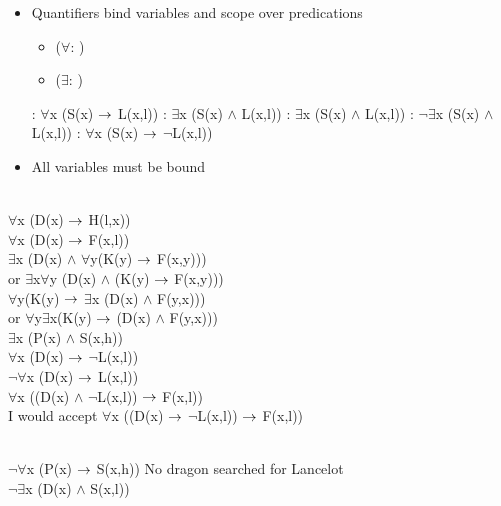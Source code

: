 \documentclass[headrule,footrule]{foils}
\begin{document}

\begin{itemize}
  \item Quantifiers bind variables and scope over predications
    \begin{itemize}
    \item {} ($\forall$: )
    \item {} ($\exists$: )
    \end{itemize}
    \begin{exe}
      \ex {}: $\forall$x (S(x)  $\rightarrow$ L(x,l))
      \ex {}: $\exists$x (S(x)  $\wedge$ L(x,l))
      \ex {}: $\exists$x (S(x)  $\wedge$ L(x,l))
      \ex {}: $\neg\exists$x (S(x)  $\wedge$ L(x,l))
      \ex {}: $\forall$x (S(x)  $\rightarrow$ $\neg$L(x,l))
    \end{exe}
  \item All variables must be bound
\end{itemize}

 \begin{exe}
    \ex {} \\
    $\forall$x (D(x)  $\rightarrow$ H(l,x))
    \ex {} \\
    $\forall$x (D(x)  $\rightarrow$ F(x,l))
    \ex {} \\
    $\exists$x  (D(x)  $\wedge$ $\forall$y(K(y)  $\rightarrow$ F(x,y)))
    \\ or  $\exists$x$\forall$y (D(x)  $\wedge$ (K(y)  $\rightarrow$ F(x,y)))
 \\   $\forall$y(K(y)   $\rightarrow$ $\exists$x  (D(x)  $\wedge$  F(y,x)))
 \\ or $\forall$y$\exists$x(K(y)   $\rightarrow$   (D(x)  $\wedge$  F(y,x)))
    \ex {} \\
    $\exists$x  (P(x)  $\wedge$ S(x,h))
\newpage
    \ex {} \\
    $\forall$x (D(x)  $\rightarrow$ $\neg$L(x,l))
    \\ $\neg\forall$x (D(x)  $\rightarrow$ L(x,l))
    \ex {} \\
    $\forall$x ((D(x)  $\wedge$ $\neg$L(x,l)) $\rightarrow$  F(x,l))
    \\ I would accept  $\forall$x ((D(x)  $\rightarrow$ $\neg$L(x,l)) $\rightarrow$  F(x,l))

    \ex {} \\
    $\neg\forall$x (P(x)  $\rightarrow$ S(x,h))
    \ex No dragon searched for Lancelot
\\
    $\neg\exists$x (D(x)  $\wedge$ S(x,l))
  \end{exe}
\end{document}
